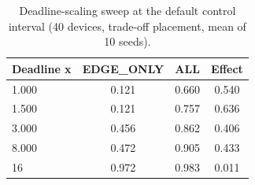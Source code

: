 \begin{table}[t]
\centering
\small
\caption{Deadline-scaling sweep at the default control interval (40 devices, trade-off placement, mean of 10 seeds).}
\label{tab:p1-deadline}
\begin{tabular}{lccc}
\toprule
Deadline x & EDGE\_ONLY & ALL & Effect \\
\midrule
1.000 & 0.121 & 0.660 & 0.540 \\
1.500 & 0.121 & 0.757 & 0.636 \\
3.000 & 0.456 & 0.862 & 0.406 \\
8.000 & 0.472 & 0.905 & 0.433 \\
16 & 0.972 & 0.983 & 0.011 \\
\bottomrule
\end{tabular}
\par\vspace{2pt}{\footnotesize\raggedright Scaling the deadlines by 16 removes the architecture effect. The threshold is about two control ticks per class, because a task waits one tick for dispatch and another for its result.\par}
\end{table}
